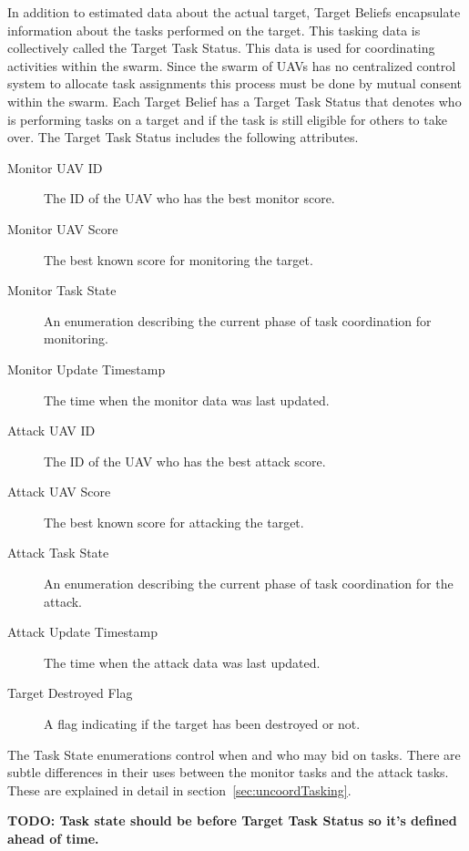 \begin{multicols*}{2}
In addition to estimated data about the actual target, Target Beliefs encapsulate information about the tasks performed on the target.  This tasking data is collectively called the Target Task Status.  This data is used for coordinating activities within the swarm.  Since the swarm of UAVs has no centralized control system to allocate task assignments this process must be done by mutual consent within the swarm.  Each Target Belief has a Target Task Status that denotes who is performing tasks on a target and if the task is still eligible for others to take over.  The Target Task Status includes the following attributes.

\begin{description}
	\item [Monitor UAV ID] The ID of the UAV who has the best monitor score.
	\item [Monitor UAV Score] The best known score for monitoring the target.
	\item [Monitor Task State] An enumeration describing the current phase of task coordination for monitoring.
	\item [Monitor Update Timestamp] The time when the monitor data was last updated.
	\item [Attack UAV ID] The ID of the UAV who has the best attack score.
	\item [Attack UAV Score] The best known score for attacking the target.
	\item [Attack Task State] An enumeration describing the current phase of task coordination for the attack.
	\item [Attack Update Timestamp] The time when the attack data was last updated.
	\item [Target Destroyed Flag] A flag indicating if the target has been destroyed or not.
\end{description}

The Task State enumerations control when and who may bid on tasks.  There are subtle differences in their uses between the monitor tasks and the attack tasks.  These are explained in detail in  section~\ref{sec:uncoordTasking}.

\textbf{TODO: Task state should be before Target Task Status so it's defined ahead of time.}


\end{multicols*}
